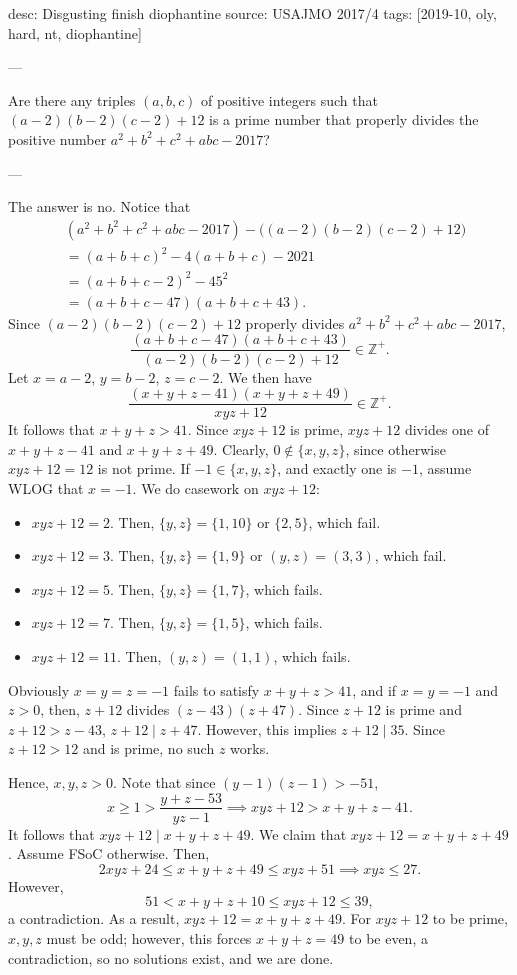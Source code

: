 desc: Disgusting finish diophantine
source: USAJMO 2017/4
tags: [2019-10, oly, hard, nt, diophantine]

---

Are there any triples $(a,b,c)$ of positive integers such that $(a-2)(b-2)(c-2)+12$ is a prime number that properly divides the positive number $a^2+b^2+c^2+abc-2017$?

---

The answer is no. Notice that
\begin{align*}
    &\left(a^2+b^2+c^2+abc-2017\right)-\big((a-2)(b-2)(c-2)+12\big)\\
    &=(a+b+c)^2-4(a+b+c)-2021\\
    &=(a+b+c-2)^2-45^2\\
    &=(a+b+c-47)(a+b+c+43).
\end{align*}
Since $(a-2)(b-2)(c-2)+12$ properly divides $a^2+b^2+c^2+abc-2017$, \[\frac{(a+b+c-47)(a+b+c+43)}{(a-2)(b-2)(c-2)+12}\in\mathbb Z^+.\]
Let $x=a-2$, $y=b-2$, $z=c-2$. We then have \[\frac{(x+y+z-41)(x+y+z+49)}{xyz+12}\in\mathbb Z^+.\]
It follows that $x+y+z>41$. Since $xyz+12$ is prime, $xyz+12$ divides one of $x+y+z-41$ and $x+y+z+49$. Clearly, $0\notin\{x,y,z\}$, since otherwise $xyz+12=12$ is not prime. If $-1\in\{x,y,z\}$, and exactly one is $-1$, assume WLOG that $x=-1$. We do casework on $xyz+12$:
\begin{itemize}[itemsep=0em]
    \item $xyz+12=2$. Then, $\{y,z\}=\{1,10\}$ or $\{2,5\}$, which fail.
    \item $xyz+12=3$. Then, $\{y,z\}=\{1,9\}$ or $(y,z)=(3,3)$, which fail.
    \item $xyz+12=5$. Then, $\{y,z\}=\{1,7\}$, which fails.
    \item $xyz+12=7$. Then, $\{y,z\}=\{1,5\}$, which fails.
    \item $xyz+12=11$. Then, $(y,z)=(1,1)$, which fails.
\end{itemize}
Obviously $x=y=z=-1$ fails to satisfy $x+y+z>41$, and if $x=y=-1$ and $z>0$, then, $z+12$ divides $(z-43)(z+47)$. Since $z+12$ is prime and $z+12>z-43$, $z+12\mid z+47$. However, this implies $z+12\mid 35$. Since $z+12>12$ and is prime, no such $z$ works.

Hence, $x,y,z>0$. Note that since $(y-1)(z-1)>-51$, \[x\ge 1>\frac{y+z-53}{yz-1}\implies  xyz+12>x+y+z-41.\]
It follows that $xyz+12\mid x+y+z+49$. We claim that $xyz+12=x+y+z+49$. Assume FSoC otherwise. Then, \[2xyz+24\le x+y+z+49\le xyz+51\implies xyz\le 27.\]
However, \[51<x+y+z+10\le xyz+12\le 39,\]
a contradiction. As a result, $xyz+12=x+y+z+49$. For $xyz+12$ to be prime, $x,y,z$ must be odd; however, this forces $ x+y+z=49$ to be even, a contradiction, so no solutions exist, and we are done.
